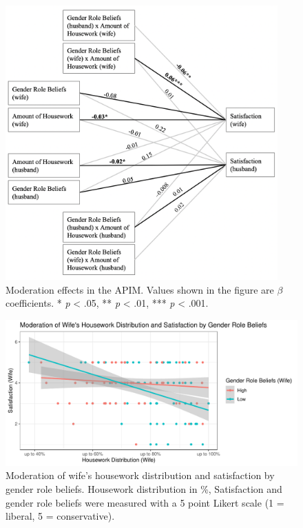 \documentclass[
  man,floatsintext]{apa6}
\begin{document}
\begin{figure}
\includegraphics[width=4.11in]{moderation} \caption{Moderation effects in the APIM. Values shown in the figure are \(\beta\) coefficients.
* \emph{p} \textless{} .05, ** \emph{p} \textless{} .01, *** \emph{p} \textless{} .001.}\label{fig:unnamed-chunk-53}
\end{figure}



\begin{figure}
\centering
\includegraphics{Final_Paper_files/figure-latex/unnamed-chunk-56-1.pdf}
\caption{\label{fig:unnamed-chunk-56}Moderation of wife's housework distribution and satisfaction by gender role beliefs. Housework distribution in \%, Satisfaction and gender role beliefs were measured with a 5 point Likert scale (1 = liberal, 5 = conservative).}
\end{figure}
\end{document}
